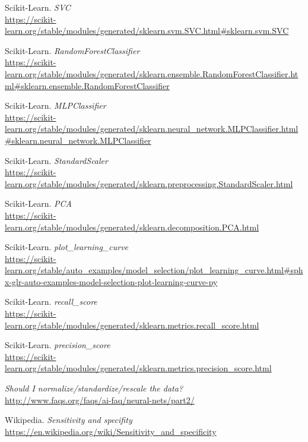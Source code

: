 \documentclass[11pt,a4paper]{article}
\begin{document}
\begin{thebibliography}{}
    
    Scikit-Learn. \textit{SVC}
    \\\url{https://scikit-learn.org/stable/modules/generated/sklearn.svm.SVC.html#sklearn.svm.SVC}
    
    Scikit-Learn. \textit{RandomForestClassifier}
    \\\url{https://scikit-learn.org/stable/modules/generated/sklearn.ensemble.RandomForestClassifier.html#sklearn.ensemble.RandomForestClassifier}
    
    Scikit-Learn. \textit{MLPClassifier}
    \\\url{https://scikit-learn.org/stable/modules/generated/sklearn.neural_network.MLPClassifier.html#sklearn.neural_network.MLPClassifier}
    
    Scikit-Learn. \textit{StandardScaler}
    \\\url{https://scikit-learn.org/stable/modules/generated/sklearn.preprocessing.StandardScaler.html}
    
    Scikit-Learn. \textit{PCA}
    \\\url{https://scikit-learn.org/stable/modules/generated/sklearn.decomposition.PCA.html}
    
    Scikit-Learn. \textit{plot\_learning\_curve}
    \\\url{https://scikit-learn.org/stable/auto_examples/model_selection/plot_learning_curve.html#sphx-glr-auto-examples-model-selection-plot-learning-curve-py}
    
    Scikit-Learn. \textit{recall\_score}
    \\\url{https://scikit-learn.org/stable/modules/generated/sklearn.metrics.recall_score.html}
    
    Scikit-Learn. \textit{precision\_score}
    \\\url{https://scikit-learn.org/stable/modules/generated/sklearn.metrics.precision_score.html}
    
    \textit{Should I normalize/standardize/rescale the data?}
    \\\url{http://www.faqs.org/faqs/ai-faq/neural-nets/part2/}
    
    Wikipedia. \textit{Sensitivity and specifity}
    \\\url{https://en.wikipedia.org/wiki/Sensitivity_and_specificity}
    

\end{thebibliography}
\end{document}
